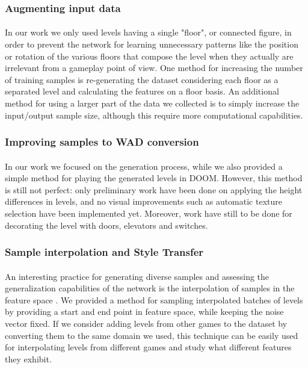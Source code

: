 \subsubsection{Augmenting input data}
\label{sec:data-augmentation}
\paragraph{} In our work we only used levels having a single "floor", or connected figure, in order to prevent the network for learning unnecessary patterns like the position or rotation of the various floors that compose the level when they actually are irrelevant from a gameplay point of view. One method for increasing the number of training samples is re-generating the dataset considering each floor as a separated level and calculating the features on a floor basis. An additional method for using a larger part of the data we collected is to simply increase the input/output sample size, although this require more computational capabilities. 

\subsubsection{Improving samples to WAD conversion}
\paragraph{} In our work we focused on the generation process, while we also provided a simple method for playing the generated levels in DOOM. However, this method is still not perfect: only preliminary work have been done on applying the height differences in levels, and no visual improvements such as automatic texture selection have been implemented yet. Moreover, work have still to be done for decorating the level with doors, elevators and switches. 

 \subsubsection{Sample interpolation and Style Transfer}
\paragraph{} An interesting practice for generating diverse samples and assessing the generalization capabilities of the network is the interpolation of samples in the feature space \cite{slerp}. We provided a method for sampling interpolated batches of levels by providing a start and end point in feature space, while keeping the noise vector fixed. If we consider adding levels from other games to the dataset by converting them to the same domain we used, this technique can be easily used for interpolating levels from different games and study what different features they exhibit.

